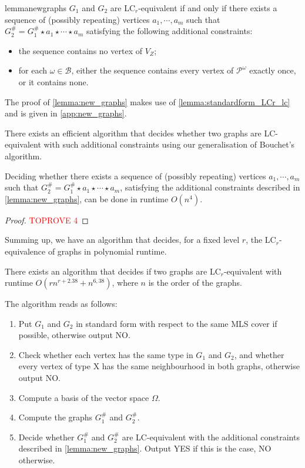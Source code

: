 \documentclass[a4paper,UKenglish,cleveref,autoref,thm-restate]{arxiv}
\begin{document}
\begin{restatable}{lemma}{newgraphs} \label{lemma:new_graphs}
    $G_1$ and $G_2$ are LC$_r$-equivalent if and only if there exists a sequence of (possibly repeating) vertices $a_1, \cdots, a_m$ such that $G^{\#}_2 = G^{\#}_1 \star a_1 \star \cdots \star a_m$ satisfying the following additional constraints:
    \begin{itemize}
        \item the sequence contains no vertex of $V_Z$;
        \item for each $\omega \in \mathcal B$, either the sequence contains every vertex of $\mathcal P^{\omega}$ exactly once, or it contains none. 
    \end{itemize}
\end{restatable}



The proof of \cref{lemma:new_graphs} makes use of \cref{lemma:standardform_LCr_lc} and is given in \cref{app:new_graphs}. 

There exists an efficient algorithm that decides whether two graphs are LC-equivalent with such additional constraints using our generalisation of Bouchet's algorithm.

\begin{lemma} \label{lemma:LC_new_graphs}
    Deciding whether there exists a sequence of (possibly repeating) vertices $a_1, \cdots, a_m$ such that $G^{\#}_2 = G^{\#}_1 \star a_1 \star \cdots \star a_m$, satisfying the additional constraints described in \cref{lemma:new_graphs}, can be done in runtime $O(n^4)$.
\end{lemma}

\begin{proof}\textcolor{red}{TOPROVE 4}\end{proof}

Summing up, we have an algorithm that decides, for a fixed level $r$,  the LC$_r$-equivalence of graphs in polynomial runtime.

\begin{theorem} \label{thm:algolcr}
    There exists an algorithm that decides if two graphs are LC$_r$-equivalent with runtime $O(r n^{r+2.38} + n^{6,38})$, where $n$ is the order of the graphs.
\end{theorem}

The algorithm reads as follows:
\begin{enumerate}
    \item Put $G_1$ and $G_2$ in standard form with respect to the same MLS cover if possible, otherwise output NO.
    \item Check whether each vertex has the same type in $G_1$ and $G_2$, and whether every vertex of type X has the same neighbourhood in both graphs, otherwise output NO.
    \item Compute a basis of the vector space $\Omega$.
    \item Compute the graphs ${G}^{\#}_1$ and ${G}^{\#}_2$.
    \item Decide whether ${G}^{\#}_1$ and ${G}^{\#}_2$ are LC-equivalent with the additional constraints described in \cref{lemma:new_graphs}. Output YES if this is the case,  NO otherwise.
\end{enumerate}
\end{document}
